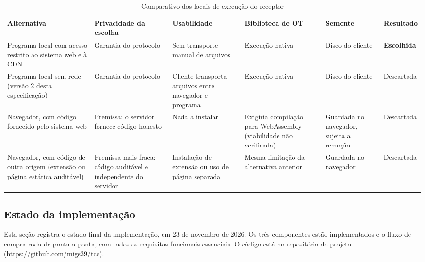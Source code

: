 \begin{table}[H]
\centering
\caption{Comparativo dos locais de execução do receptor}\label{tab:comp-receptor}
\footnotesize
\renewcommand{\arraystretch}{1.25}
\begin{tabularx}{\textwidth}{@{}>{\raggedright\arraybackslash}p{}
  >{\raggedright\arraybackslash}X >{\raggedright\arraybackslash}X
  >{\raggedright\arraybackslash}X >{\raggedright\arraybackslash}X
  >{\raggedright\arraybackslash}p{}@{}}
\toprule
\textbf{Alternativa} & \textbf{Privacidade da escolha} & \textbf{Usabilidade} &
\textbf{Biblioteca de OT} & \textbf{Semente} & \textbf{Resultado} \\
\midrule
Programa local com acesso restrito ao sistema web e à CDN &
Garantia do protocolo &
Sem transporte manual de arquivos &
Execução nativa &
Disco do cliente &
\textbf{Escolhida} \\
\addlinespace
Programa local sem rede (versão 2 desta especificação) &
Garantia do protocolo &
Cliente transporta arquivos entre navegador e programa &
Execução nativa &
Disco do cliente &
Descartada \\
\addlinespace
Navegador, com código fornecido pelo sistema web &
Premissa: o servidor fornece código honesto &
Nada a instalar &
Exigiria compilação para WebAssembly (viabilidade não verificada) &
Guardada no navegador, sujeita a remoção &
Descartada \\
\addlinespace
Navegador, com código de outra origem (extensão ou página estática auditável) &
Premissa mais fraca: código auditável e independente do servidor &
Instalação de extensão ou uso de página separada &
Mesma limitação da alternativa anterior &
Guardada no navegador &
Descartada \\
\bottomrule
\end{tabularx}
\end{table}


\subsection{Estado da implementação}\label{sec:estado}

Esta seção registra o estado final da implementação, em 23 de novembro de
2026. Os três componentes estão implementados e o fluxo de compra roda de
ponta a ponta, com todos os requisitos funcionais essenciais. O código está no
repositório do projeto (\url{https://github.com/migs39/tcc}).

